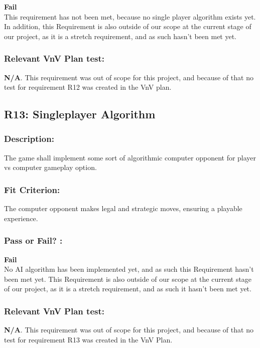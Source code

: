 \documentclass[12pt, titlepage]{article}
\begin{document}
 \noindent \textbf{Fail}\\
 
 This requirement has not been met, because no single player algorithm exists yet. In addition, this Requirement is also outside of our scope at the current stage of our project, as it is a stretch requirement, and as such hasn't been met yet.

\subsubsection*{Relevant VnV Plan test: } \textbf{N/A}. This requirement was out of scope for this project, and because of that no test for requirement R12 was created in the VnV plan.


\subsection{R13: Singleplayer Algorithm} 
\label{R13} 

\subsubsection*{Description:} The game shall implement some sort of algorithmic computer opponent for  player vs computer gameplay option.

\subsubsection*{Fit Criterion:} The computer opponent makes legal and strategic moves, ensuring a playable experience.

\subsubsection*{Pass or Fail? :} 

 \noindent \textbf{Fail}\\
 
  No AI algorithm has been implemented yet, and as such this Requirement hasn't been met yet. This Requirement is also outside of our scope at the current stage of our project, as it is a stretch requirement, and as such it hasn't been met yet.

\subsubsection*{Relevant VnV Plan test: } \textbf{N/A}. This requirement was out of scope for this project, and because of that no test for requirement R13 was created in the VnV Plan.
\end{document}
